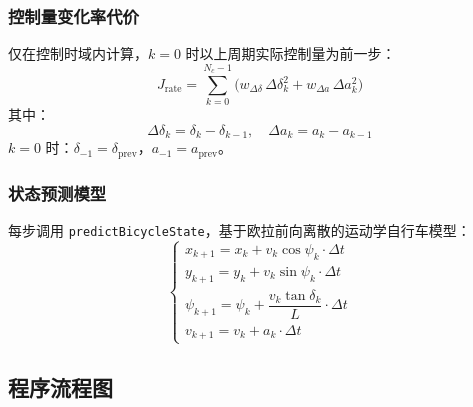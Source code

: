 \documentclass[a4paper,10pt]{article}
\begin{document}
\subsubsection{控制量变化率代价}

仅在控制时域内计算，$k{=}0$ 时以上周期实际控制量为前一步：
\begin{equation}
  J_{\text{rate}} = \sum_{k=0}^{N_c-1} \Big( w_{\Delta\delta} \, \Delta\delta_k^2 + w_{\Delta a} \, \Delta a_k^2 \Big)
\end{equation}
其中：
\begin{equation}
  \Delta\delta_k = \delta_k - \delta_{k-1}, \quad \Delta a_k = a_k - a_{k-1}
\end{equation}
$k{=}0$ 时：$\delta_{-1} = \delta_{\text{prev}}$，$a_{-1} = a_{\text{prev}}$。

\subsubsection{状态预测模型}

每步调用 \texttt{predictBicycleState}，基于欧拉前向离散的运动学自行车模型：
\begin{equation}
  \begin{cases}
    x_{k+1} = x_k + v_k \cos\psi_k \cdot \Delta t \\
    y_{k+1} = y_k + v_k \sin\psi_k \cdot \Delta t \\
    \psi_{k+1} = \psi_k + \dfrac{v_k \tan\delta_k}{L} \cdot \Delta t \\
    v_{k+1} = v_k + a_k \cdot \Delta t
  \end{cases}
\end{equation}

\subsection{程序流程图}
\end{document}
